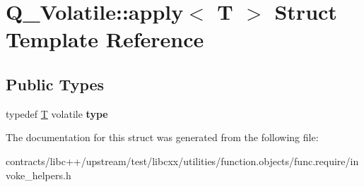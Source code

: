 \hypertarget{struct_q___volatile_1_1apply}{}\section{Q\+\_\+\+Volatile\+:\+:apply$<$ T $>$ Struct Template Reference}
\label{struct_q___volatile_1_1apply}
\subsection*{Public Types}
\begin{DoxyCompactItemize}
\item 
\mbox{\label{struct_q___volatile_1_1apply_a56479584ca48988abb6324d3a283c384}} 
typedef \mbox{\hyperlink{struct_t}{T}} volatile {\bfseries type}
\end{DoxyCompactItemize}


The documentation for this struct was generated from the following file\+:\begin{DoxyCompactItemize}
\item 
contracts/libc++/upstream/test/libcxx/utilities/function.\+objects/func.\+require/invoke\+\_\+helpers.\+h\end{DoxyCompactItemize}
